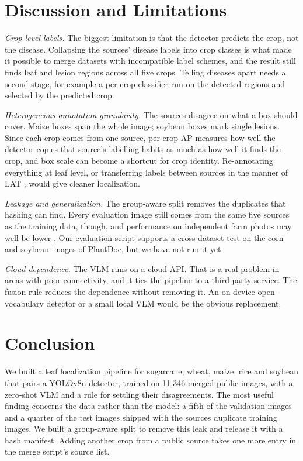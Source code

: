 \documentclass[conference]{IEEEtran}
\begin{document}
\section{Discussion and Limitations}\label{sec:discussion}

\textit{Crop-level labels.} The biggest limitation is that the detector predicts the crop, not the disease. Collapsing the sources' disease labels into crop classes is what made it possible to merge datasets with incompatible label schemes, and the result still finds leaf and lesion regions across all five crops. Telling diseases apart needs a second stage, for example a per-crop classifier run on the detected regions and selected by the predicted crop.

\textit{Heterogeneous annotation granularity.} The sources disagree on what a box should cover. Maize boxes span the whole image; soybean boxes mark single lesions. Since each crop comes from one source, per-crop AP measures how well the detector copies that source's labelling habits as much as how well it finds the crop, and box scale can become a shortcut for crop identity. Re-annotating everything at leaf level, or transferring labels between sources in the manner of LAT \cite{kennerley2026lat}, would give cleaner localization.

\textit{Leakage and generalization.} The group-aware split removes the duplicates that hashing can find. Every evaluation image still comes from the same five sources as the training data, though, and performance on independent farm photos may well be lower \cite{singh2020plantdoc, david2020gwhd}. Our evaluation script supports a cross-dataset test on the corn and soybean images of PlantDoc, but we have not run it yet.

\textit{Cloud dependence.} The VLM runs on a cloud API. That is a real problem in areas with poor connectivity, and it ties the pipeline to a third-party service. The fusion rule reduces the dependence without removing it. An on-device open-vocabulary detector \cite{cheng2024yoloworld} or a small local VLM would be the obvious replacement.

\section{Conclusion}\label{sec:conclusion}

We built a leaf localization pipeline for sugarcane, wheat, maize, rice and soybean that pairs a YOLOv8n detector, trained on 11,346 merged public images, with a zero-shot VLM and a rule for settling their disagreements. The most useful finding concerns the data rather than the model: a fifth of the validation images and a quarter of the test images shipped with the sources duplicate training images. We built a group-aware split to remove this leak and release it with a hash manifest. Adding another crop from a public source takes one more entry in the merge script's source list.
\end{document}
